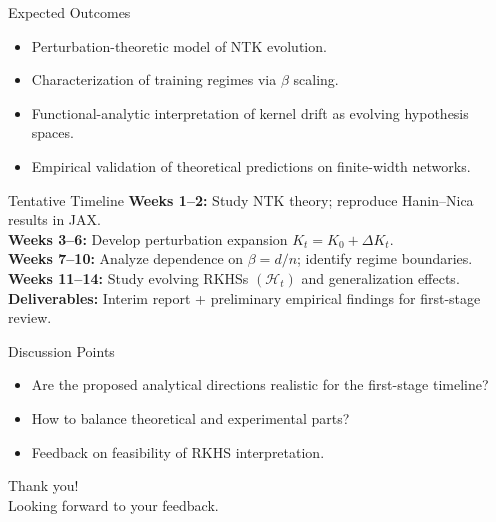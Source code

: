 \documentclass{beamer}
\begin{document}
\begin{frame}{Expected Outcomes}
	\begin{itemize}
		\item Perturbation-theoretic model of NTK evolution.
		\item Characterization of training regimes via $\beta$ scaling.
		\item Functional-analytic interpretation of kernel drift as evolving hypothesis spaces.
		\item Empirical validation of theoretical predictions on finite-width networks.
	\end{itemize}
\end{frame}

\begin{frame}{Tentative Timeline}
	\small
	\textbf{Weeks 1–2:} Study NTK theory; reproduce Hanin–Nica results in JAX.\\
	\textbf{Weeks 3–6:} Develop perturbation expansion $K_t = K_0 + \Delta K_t$.\\
	\textbf{Weeks 7–10:} Analyze dependence on $\beta = d/n$; identify regime boundaries.\\
	\textbf{Weeks 11–14:} Study evolving RKHSs $(\mathcal H_t)$ and generalization effects.\\[1em]
	\textbf{Deliverables:}
	Interim report + preliminary empirical findings for first-stage review.
\end{frame}

\begin{frame}{Discussion Points}
	\begin{itemize}
		\item Are the proposed analytical directions realistic for the first-stage timeline?
		\item How to balance theoretical and experimental parts?
		\item Feedback on feasibility of RKHS interpretation.
	\end{itemize}
\end{frame}

\begin{frame}
	\Large Thank you! \\
	\vspace{0.5em}
	\normalsize Looking forward to your feedback.
\end{frame}
\end{document}
